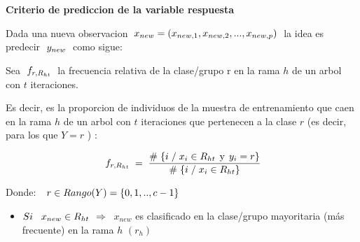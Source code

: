 \documentclass[
  11pt,
  a4paper,
]{article}
\providecommand{\tightlist}{%
  \setlength{\itemsep}{0pt}\setlength{\parskip}{0pt}}
\begin{document}
\newpage

\textbf{Criterio de prediccion de la variable respuesta}

Dada una nueva observacion
\(\hspace{0.1cm} x_{new}= (x_{new,1},x_{new,2},...,x_{new,p} ) \hspace{0.1cm}\)
la idea es predecir \(\hspace{0.1cm} y_{new} \hspace{0.1cm}\) como
sigue:

Sea \(\hspace{0.1 cm} f_{r, R_{ht}} \hspace{0.1 cm}\) la frecuencia
relativa de la clase/grupo r en la rama \(h\) de un arbol con \(t\)
iteraciones.

Es decir, es la proporcion de individuos de la muestra de entrenamiento
que caen en la rama \(h\) de un arbol con \(t\) iteraciones que
pertenecen a la clase \(r\) (es decir, para los que \(Y=r\) ) :

\[ \hspace{0.1 cm} f_{r , R_{ht}} \hspace{0.1 cm} = \hspace{0.1 cm} \dfrac{\# \hspace{0.1 cm}\lbrace i \hspace{0.1 cm}/\hspace{0.1 cm} x_i \in R_{ht} \hspace{0.15 cm}\text{y}\hspace{0.15 cm} y_i = r \rbrace}{\# \hspace{0.1 cm}\lbrace i \hspace{0.1 cm}/\hspace{0.1 cm} x_i \in R_{ht}  \rbrace} \]

\vspace{0.5cm}

Donde: \(\hspace{0.25cm} r \in Rango(Y) = \lbrace 0,1,..,c-1 \rbrace\)

\vspace{0.7cm}

\begin{itemize}
\tightlist
\item
  \(Si \hspace{0.3cm} x_{new} \in R_{ht} \hspace{0.15cm} \Rightarrow \hspace{0.15cm}\)
  \(x_{new}\) es clasificado en la clase/grupo mayoritaria (más
  frecuente) en la rama \(h\) \((r_h)\)
\end{itemize}
\end{document}
